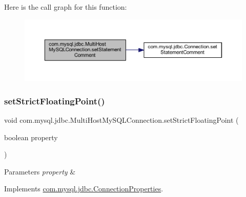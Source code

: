 Here is the call graph for this function\+:
\nopagebreak
\begin{figure}[H]
\begin{center}
\leavevmode
\includegraphics[width=350pt]{classcom_1_1mysql_1_1jdbc_1_1_multi_host_my_s_q_l_connection_ae16daacee48aa9a98fa24374bf6e7681_cgraph}
\end{center}
\end{figure}
\mbox{\label{classcom_1_1mysql_1_1jdbc_1_1_multi_host_my_s_q_l_connection_a8953dad452ece9ae8a1f2d3cec6ca4ab}} 
\subsubsection{\texorpdfstring{set\+Strict\+Floating\+Point()}{setStrictFloatingPoint()}}
{\footnotesize\ttfamily void com.\+mysql.\+jdbc.\+Multi\+Host\+My\+S\+Q\+L\+Connection.\+set\+Strict\+Floating\+Point (\begin{DoxyParamCaption}\item[{boolean}]{property }\end{DoxyParamCaption})}


\begin{DoxyParams}{Parameters}
{\em property} & \\
\hline
\end{DoxyParams}


Implements \mbox{\hyperlink{interfacecom_1_1mysql_1_1jdbc_1_1_connection_properties_afbb6b6808923b1d248ce45db64bafb28}{com.\+mysql.\+jdbc.\+Connection\+Properties}}.

